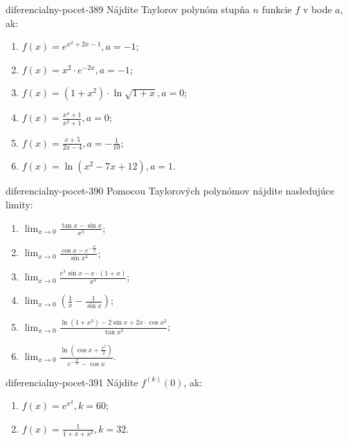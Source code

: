 \begin{defproblem}{diferencialny-pocet-389}
Nájdite Taylorov polynóm stupňa $n$ funkcie $f$ v bode $a$, ak:
\begin{multicols}{2}
\begin{enumerate}
    \item $f(x)=e^{x^2+2x-1},a=-1$;
	\item $f(x)=x^2\cdot e^{-2x},a=-1$;
	\item $f(x)=(1+x^2)\cdot\ln\sqrt{1+x},a=0$;
	\item $f(x)=\frac{x^4+1}{x^2+1},a=0$;
	\item $f(x)=\frac{x+5}{2x-4},a=-\frac{1}{10}$;
	\item $f(x)=\ln (x^2-7x+12),a=1$.
\end{enumerate}
\end{multicols}
\end{defproblem}

\begin{defproblem}{diferencialny-pocet-390}
Pomocou Taylorových polynómov nájdite nasledujúce limity:
\begin{multicols}{2}
\begin{enumerate}
    \item $\lim_{x\rightarrow 0}\frac{\tan x-\sin x}{x^3}$;
	\item $\lim_{x\rightarrow 0}\frac{\cos x-e^{-\frac{x^2}{2}}}{\sin x^4}$;
	\item $\lim_{x\rightarrow 0}\frac{e^x\sin x-x\cdot(1+x)}{x^3}$;
	\item $\lim_{x\rightarrow 0}(\frac{1}{x}-\frac{1}{\sin x})$;
	\item $\lim_{x\rightarrow 0}\frac{\ln (1+x^3)-2\sin x+2x\cdot\cos x^2}{\tan x^3}$;
	\item $\lim_{x\rightarrow 0}\frac{\ln (\cos x +\frac{x^2}{2})}{e^{-\frac{x^2}{2}}-\cos x}$.
\end{enumerate}
\end{multicols}
\end{defproblem}

\begin{defproblem}{diferencialny-pocet-391}
Nájdite $f^{(k)}(0)$, ak:
\begin{multicols}{2}
\begin{enumerate}
    \item $f(x)=e^{x^2},k=60$;
	\item $f(x)=\frac{1}{1+x+x^2},k=32$.
\end{enumerate}
\end{multicols}
\end{defproblem}

